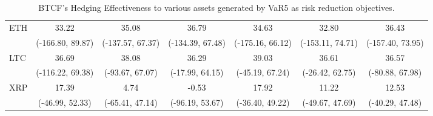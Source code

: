 \begin{table}[p]
{\begin{tabular}{lcccccc}
ETH     &             33.22 &             35.08 &             36.79 &             34.63 &             32.80 &             36.43 \\
        &  (-166.80, 89.87) &  (-137.57, 67.37) &  (-134.39, 67.48) &  (-175.16, 66.12) &  (-153.11, 74.71) &  (-157.40, 73.95) \\
LTC     &             36.69 &             38.08 &             36.29 &             39.03 &             36.61 &             36.57 \\
        &  (-116.22, 69.38) &   (-93.67, 67.07) &   (-17.99, 64.15) &   (-45.19, 67.24) &   (-26.42, 62.75) &   (-80.88, 67.98) \\
XRP     &             17.39 &              4.74 &             -0.53 &             17.92 &             11.22 &             12.53 \\
        &   (-46.99, 52.33) &   (-65.41, 47.14) &   (-96.19, 53.67) &   (-36.40, 49.22) &   (-49.67, 47.69) &   (-40.29, 47.48) \\
\bottomrule
\end{tabular}}
\caption{BTCF's Hedging Effectiveness to various assets generated by VaR5 as risk reduction objectives.}
\label{tab:VaR5HE}
\end{table}